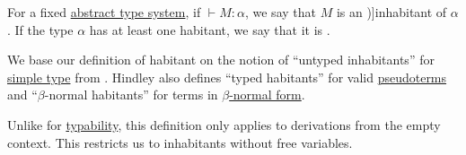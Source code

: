 \begin{definition}\label{def:type_habitation}
  For a fixed \hyperref[def:abstract_type_system]{abstract type system}, if \( {}\vdash M: \alpha \), we say that \( M \) is an \term[en=untyped inhabitant (\cite[8A1]{Hindley1997STT})]{inhabitant} of \( \alpha \). If the type \( \alpha \) has at least one habitant, we say that it is .
\end{definition}
\begin{comments}
  \item We base our definition of habitant on the notion of \enquote{untyped inhabitants} for \hyperref[def:simple_type]{simple type} from \cite[def. 8A1]{Hindley1997STT}. Hindley also defines \enquote{typed habitants} for valid \hyperref[def:pseudoterm]{pseudoterms} and \enquote{\( \beta \)-normal habitants} for terms in \hyperref[def:lambda_reduction_normal_form]{\( \beta \)-normal form}.

  \item Unlike for \hyperref[def:typability]{typability}, this definition only applies to derivations from the empty context. This restricts us to inhabitants without free variables.
\end{comments}

